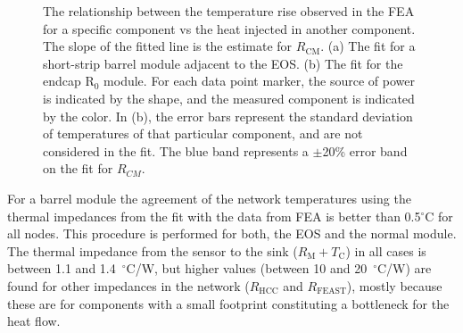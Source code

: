 \begin{figure}[ht]
\centering
{}
\caption{The relationship between the temperature rise observed in the FEA for a specific component vs the heat injected in another component. The slope of the fitted line is the estimate for $R_\text{CM}$.
(a) The fit for a short-strip barrel module adjacent to the EOS. (b) The fit for the endcap R$_0$ module.
For each data point marker, the source of power is indicated by the shape, and the measured component is indicated
by the color.
In (b), the error bars represent the standard deviation of temperatures of
that particular component, and are not considered in the fit.
The blue band represents a $\pm$20\% error band on the fit for $R_{CM}$.
}
\label{fig:solving_for_Rcm}
\end{figure}


For a barrel module the agreement of the network temperatures using the thermal impedances from the fit with the data from FEA is better than 0.5$^\circ$C for all nodes. This procedure is performed for both, the EOS and the normal module. The thermal impedance from the sensor to the sink ($R_\text{M}+T_\text{C}$) in all cases is between 1.1 and 1.4~$^\circ$C/W, but higher values (between 10 and 20~$^\circ$C/W) are found for other impedances in the network ($R_\text{HCC}$ and $R_\text{FEAST}$), mostly because these are for components with a small footprint constituting a bottleneck for the heat flow.

